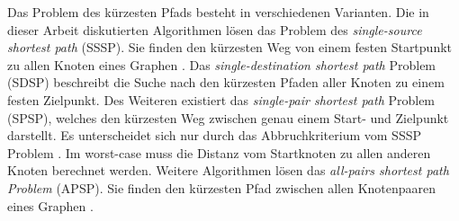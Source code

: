 Das Problem des kürzesten Pfads besteht in verschiedenen Varianten. Die in dieser Arbeit diskutierten Algorithmen lösen das Problem des \textit{single-source shortest path} (SSSP). Sie finden den kürzesten Weg von einem festen Startpunkt zu allen Knoten eines Graphen \cite{Gu.2018}. Das \textit{single-destination shortest path} Problem (SDSP)  beschreibt die Suche nach den kürzesten Pfaden aller Knoten zu einem festen Zielpunkt. Des Weiteren existiert das \textit{single-pair shortest path} Problem (SPSP), welches den kürzesten Weg zwischen genau einem Start- und Zielpunkt darstellt. Es unterscheidet sich nur durch das Abbruchkriterium vom SSSP Problem \cite{Ottmann.2017}. Im worst-case muss die Distanz vom Startknoten zu allen anderen Knoten berechnet werden. Weitere Algorithmen lösen das \textit{all-pairs shortest path Problem} (APSP). Sie finden den kürzesten Pfad zwischen allen Knotenpaaren eines Graphen \cite{Cormen.2009}.
